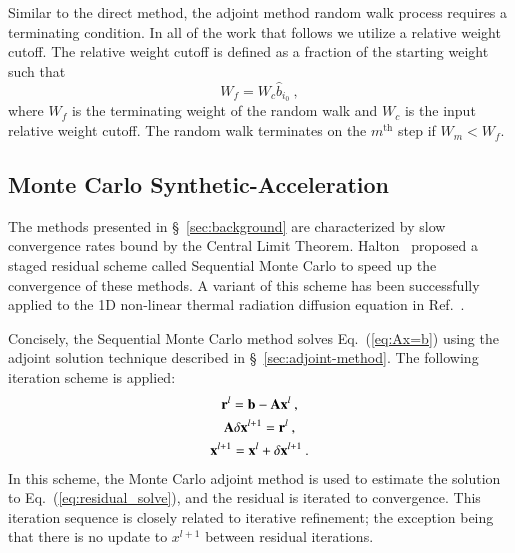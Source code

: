 \documentclass[preprint,12pt]{elsarticle}
\newcommand{\vA}{\ensuremath{\ve{A}}}
\newcommand{\vb}{\ensuremath{\ve{b}}}
\newcommand{\vx}{\ensuremath{\ve{x}}}
\newcommand{\vr}{\ensuremath{\ve{r}}}
\begin{document}
Similar to the direct method, the adjoint method random walk process
requires a terminating condition.  In all of the work that follows we
utilize a relative weight cutoff.  The relative weight cutoff is
defined as a fraction of the starting weight such that
\begin{equation}
  W_f = W_c\hat{b}_{i_0}\:,
  \label{eq:weight_cutoff}
\end{equation}
where $W_f$ is the terminating weight of the random walk and $W_c$ is
the input relative weight cutoff. The random walk terminates on the
$m^\text{th}$ step if $W_m < W_f$.


\subsection{Monte Carlo Synthetic-Acceleration}
\label{sec:iter-refin-monte}

The methods presented in \S~\ref{sec:background} are characterized by
slow convergence rates bound by the Central Limit Theorem.
Halton~\cite{halton_1962,halton_1994} proposed a staged residual
scheme called Sequential Monte Carlo to speed up the convergence of
these methods.  A variant of this scheme has been successfully applied
to the 1D non-linear thermal radiation diffusion equation in
Ref.~\cite{evans_2003}.

Concisely, the Sequential Monte Carlo method solves
Eq.~(\ref{eq:Ax=b}) using the adjoint solution technique described in
\S~\ref{sec:adjoint-method}.  The following iteration scheme is
applied:
\begin{subequations}
  \begin{gather}
    \vr^{l} = \vb - \vA\vx^{l}\:, \\ \vA\delta\vx^{l+1} =
    \vr^{l}\:, \label{eq:residual_solve}\\ \vx^{l+1} = \vx^{l} +
    \delta\vx^{l+1}\:.
  \end{gather}
\end{subequations}
In this scheme, the Monte Carlo adjoint method is used to estimate the
solution to Eq.~(\ref{eq:residual_solve}), and the residual is
iterated to convergence.  This iteration sequence is closely related
to iterative refinement; the exception being that there is no update
to $x^{l+1}$ between residual iterations.
\end{document}
